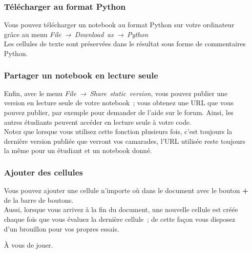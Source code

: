    \hypertarget{tuxe9luxe9charger-au-format-python}{%
\subsubsection{Télécharger au format
Python}\label{tuxe9luxe9charger-au-format-python}}

    Vous pouvez télécharger un notebook au format Python sur votre
ordinateur grâce au menu \emph{File~→~Download~as~→~Python}\\

    Les cellules de texte sont préservées dans le résultat sous forme de
commentaires Python.

    \hypertarget{partager-un-notebook-en-lecture-seule}{%
\subsubsection{Partager un notebook en lecture
seule}\label{partager-un-notebook-en-lecture-seule}}

    Enfin, avec le menu \emph{File~→~Share~static~version}, vous pouvez
publier une version en lecture seule de votre notebook~; vous obtenez
une URL que vous pouvez publier, par exemple pour demander de l'aide sur
le forum. Ainsi, les autres étudiants peuvent accéder en lecture seule à
votre code.\\

    Notez que lorsque vous utilisez cette fonction plusieurs fois, c'est
toujours la dernière version publiée que verront vos camarades, l'URL
utilisée reste toujours la même pour un étudiant et un notebook donné.

    \hypertarget{ajouter-des-cellules}{%
\subsubsection{Ajouter des cellules}\label{ajouter-des-cellules}}

    Vous pouvez ajouter une cellule n'importe où dans le document avec le
bouton \textbf{+} de la barre de boutons.\\

Aussi, lorsque vous arrivez à la fin du document, une nouvelle cellule
est créée chaque fois que vous évaluez la dernière cellule~; de cette
façon vous disposez d'un brouillon pour vos propres essais.

À vous de jouer.